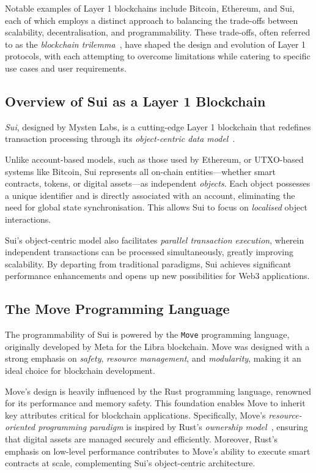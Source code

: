 \documentclass[english, 12pt, a4paper, biz, utf8, a-2b, online]{aaltothesis}
\begin{document}
Notable examples of Layer 1 blockchains include Bitcoin, Ethereum, and Sui, each of which employs a distinct approach to balancing the trade-offs between scalability, decentralisation, and programmability. These trade-offs, often referred to as the \emph{blockchain trilemma}~\cite{werth2023review}, have shaped the design and evolution of Layer 1 protocols, with each attempting to overcome limitations while catering to specific use cases and user requirements.

\subsection{Overview of Sui as a Layer 1 Blockchain}
\emph{Sui}, designed by Mysten Labs, is a cutting-edge Layer 1 blockchain that redefines transaction processing through its \emph{object-centric data model}~\cite{suiobjects}. 

Unlike account-based models, such as those used by Ethereum, or UTXO-based systems like Bitcoin, Sui represents all on-chain entities—whether smart contracts, tokens, or digital assets—as independent \emph{objects}. Each object possesses a unique identifier and is directly associated with an account, eliminating the need for global state synchronisation. This allows Sui to focus on \emph{localised} object interactions.

Sui's object-centric model also facilitates \emph{parallel transaction execution}, wherein independent transactions can be processed simultaneously, greatly improving scalability. By departing from traditional paradigms, Sui achieves significant performance enhancements and opens up new possibilities for Web3 applications.

\subsection{The Move Programming Language}
The programmability of Sui is powered by the \texttt{Move} programming language, originally developed by Meta for the Libra blockchain. Move was designed with a strong emphasis on \emph{safety}, \emph{resource management}, and \emph{modularity}, making it an ideal choice for blockchain development.

Move's design is heavily influenced by the Rust programming language, renowned for its performance and memory safety. This foundation enables Move to inherit key attributes critical for blockchain applications. Specifically, Move's \emph{resource-oriented programming paradigm} is inspired by Rust's \emph{ownership model}~\cite{rust_ownership}, ensuring that digital assets are managed securely and efficiently. Moreover, Rust's emphasis on low-level performance contributes to Move's ability to execute smart contracts at scale, complementing Sui's object-centric architecture.
\end{document}
